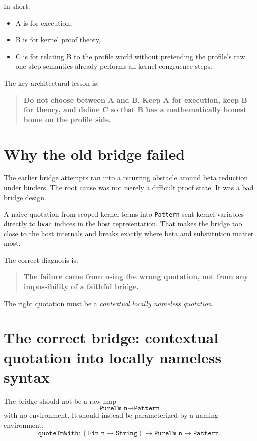 \documentclass[11pt]{article}
\begin{document}
In short:

\begin{itemize}
  \item A is for execution,
  \item B is for kernel proof theory,
  \item C is for relating B to the profile world without pretending the profile's raw one-step semantics already performs all kernel congruence steps.
\end{itemize}

The key architectural lesson is:

\begin{quote}
\textbf{Do not choose between A and B. Keep A for execution, keep B for theory, and define C so that B has a mathematically honest home on the profile side.}
\end{quote}

\section{Why the old bridge failed}

The earlier bridge attempts ran into a recurring obstacle around beta reduction under binders. The root cause was not merely a difficult proof state. It was a bad bridge design.

A naive quotation from scoped kernel terms into \texttt{Pattern} sent kernel variables directly to \texttt{bvar} indices in the host representation. That makes the bridge too close to the host internals and breaks exactly where beta and substitution matter most.

The correct diagnosis is:

\begin{quote}
\textbf{The failure came from using the wrong quotation, not from any impossibility of a faithful bridge.}
\end{quote}

The right quotation must be a \emph{contextual locally nameless quotation}.

\section{The correct bridge: contextual quotation into locally nameless syntax}

The bridge should not be a raw map
\[
\texttt{PureTm n} \to \texttt{Pattern}
\]
with no environment. It should instead be parameterized by a naming environment:
\[
\texttt{quoteTmWith} : (\texttt{Fin n} \to \texttt{String}) \to \texttt{PureTm n} \to \texttt{Pattern}.
\]
\end{document}

